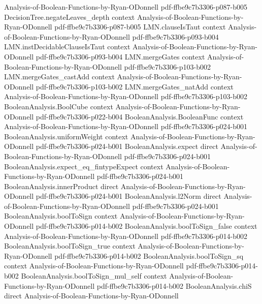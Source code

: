 \begin{theorem}
  {Analysis-of-Boolean-Functions-by-Ryan-ODonnell}
  {pdf-ffbe9c7b3306-p087-b005}
\proofstep
  {DecisionTree.negateLeaves_depth}
  {context}
  {Analysis-of-Boolean-Functions-by-Ryan-ODonnell}
  {pdf-ffbe9c7b3306-p087-b005}
\proofstep
  {LMN.clauseIsTaut}
  {context}
  {Analysis-of-Boolean-Functions-by-Ryan-ODonnell}
  {pdf-ffbe9c7b3306-p093-b004}
\proofstep
  {LMN.instDecidableClauseIsTaut}
  {context}
  {Analysis-of-Boolean-Functions-by-Ryan-ODonnell}
  {pdf-ffbe9c7b3306-p093-b004}
\proofstep
  {LMN.mergeGates}
  {context}
  {Analysis-of-Boolean-Functions-by-Ryan-ODonnell}
  {pdf-ffbe9c7b3306-p103-b002}
\proofstep
  {LMN.mergeGates_castAdd}
  {context}
  {Analysis-of-Boolean-Functions-by-Ryan-ODonnell}
  {pdf-ffbe9c7b3306-p103-b002}
\proofstep
  {LMN.mergeGates_natAdd}
  {context}
  {Analysis-of-Boolean-Functions-by-Ryan-ODonnell}
  {pdf-ffbe9c7b3306-p103-b002}
\proofstep
  {BooleanAnalysis.BoolCube}
  {context}
  {Analysis-of-Boolean-Functions-by-Ryan-ODonnell}
  {pdf-ffbe9c7b3306-p022-b004}
\proofstep
  {BooleanAnalysis.BooleanFunc}
  {context}
  {Analysis-of-Boolean-Functions-by-Ryan-ODonnell}
  {pdf-ffbe9c7b3306-p024-b001}
\proofstep
  {BooleanAnalysis.uniformWeight}
  {context}
  {Analysis-of-Boolean-Functions-by-Ryan-ODonnell}
  {pdf-ffbe9c7b3306-p024-b001}
\proofstep
  {BooleanAnalysis.expect}
  {direct}
  {Analysis-of-Boolean-Functions-by-Ryan-ODonnell}
  {pdf-ffbe9c7b3306-p024-b001}
\proofstep
  {BooleanAnalysis.expect_eq_fintypeExpect}
  {context}
  {Analysis-of-Boolean-Functions-by-Ryan-ODonnell}
  {pdf-ffbe9c7b3306-p024-b001}
\proofstep
  {BooleanAnalysis.innerProduct}
  {direct}
  {Analysis-of-Boolean-Functions-by-Ryan-ODonnell}
  {pdf-ffbe9c7b3306-p024-b001}
\proofstep
  {BooleanAnalysis.l2Norm}
  {direct}
  {Analysis-of-Boolean-Functions-by-Ryan-ODonnell}
  {pdf-ffbe9c7b3306-p024-b001}
\proofstep
  {BooleanAnalysis.boolToSign}
  {context}
  {Analysis-of-Boolean-Functions-by-Ryan-ODonnell}
  {pdf-ffbe9c7b3306-p014-b002}
\proofstep
  {BooleanAnalysis.boolToSign_false}
  {context}
  {Analysis-of-Boolean-Functions-by-Ryan-ODonnell}
  {pdf-ffbe9c7b3306-p014-b002}
\proofstep
  {BooleanAnalysis.boolToSign_true}
  {context}
  {Analysis-of-Boolean-Functions-by-Ryan-ODonnell}
  {pdf-ffbe9c7b3306-p014-b002}
\proofstep
  {BooleanAnalysis.boolToSign_sq}
  {context}
  {Analysis-of-Boolean-Functions-by-Ryan-ODonnell}
  {pdf-ffbe9c7b3306-p014-b002}
\proofstep
  {BooleanAnalysis.boolToSign_mul_self}
  {context}
  {Analysis-of-Boolean-Functions-by-Ryan-ODonnell}
  {pdf-ffbe9c7b3306-p014-b002}
\proofstep
  {BooleanAnalysis.chiS}
  {direct}
  {Analysis-of-Boolean-Functions-by-Ryan-ODonnell}

\end{theorem}
